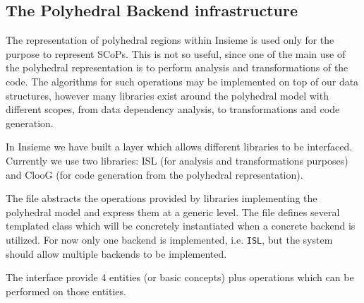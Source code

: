\subsection{The Polyhedral Backend infrastructure}

The representation of polyhedral regions within Insieme is used only for the
purpose to represent SCoPs. This is not so useful, since one of the main use of
the polyhedral representation is to perform analysis and transformations of the
code. The algorithms for such operations may be implemented on top of our data
structures, however many libraries exist around the polyhedral model with
different scopes, from data dependency analysis, to transformations and code
generation. 

In Insieme we have built a layer which allows different libraries to be
interfaced. Currently we use two libraries: ISL (for analysis and
transformations purposes) and ClooG (for code generation from the polyhedral
representation).

The file  abstracts the operations provided
by libraries implementing the polyhedral model and express them at a generic
level. The file defines several templated class which will be concretely
instantiated when a concrete backend is utilized. For now only one backend is
implemented, i.e. {\tt ISL}, but the system should allow multiple backends to be
implemented. 

The interface provide 4 entities (or basic concepts) plus operations which can
be performed on those entities. 

